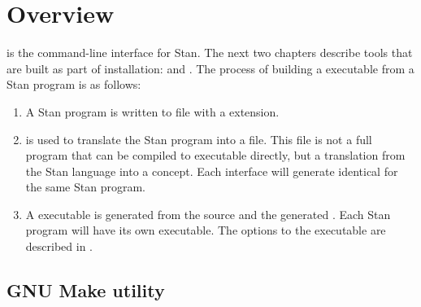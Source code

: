 \chapter{Overview}

\noindent
\CmdStan is the command-line interface for Stan. The next two
chapters describe tools that are built as part of \CmdStan
installation:  and . The process of building a
\CmdStan executable from a Stan program is as follows:
%
\begin{enumerate}
  \item A Stan program is written to file with a 
    extension.
  \item {} is used to translate the Stan program into a
    \Cpp file. This \Cpp file is not a full program that can be
    compiled to executable directly, but a translation from the Stan
    language into a \Cpp concept. Each interface will generate identical
    \Cpp for the same Stan program.
  \item A \CmdStan executable is generated from the \CmdStan source
    and the generated \Cpp. Each Stan program will have its own
    \CmdStan executable. The options to the \CmdStan executable are
    described in .
\end{enumerate}

\section{GNU Make utility}

